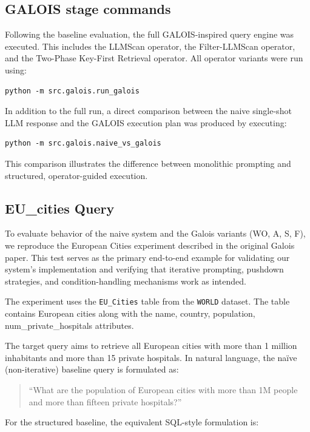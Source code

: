 \documentclass[12pt]{article}
\begin{document}
\subsection{GALOIS stage commands}
Following the baseline evaluation, the full GALOIS-inspired query engine was executed. This includes the LLMScan operator, the Filter-LLMScan operator, and the Two-Phase Key-First Retrieval operator. All operator variants were run using:

\begin{verbatim}
python -m src.galois.run_galois
\end{verbatim}

In addition to the full run, a direct comparison between the naive single-shot LLM response and the GALOIS execution plan was produced by executing:

\begin{verbatim}
python -m src.galois.naive_vs_galois
\end{verbatim}

This comparison illustrates the difference between monolithic prompting and structured, operator-guided execution.

\subsection{EU\_cities Query}

To evaluate behavior of the naive system and the Galois variants (WO, A, S, F), we reproduce the European Cities experiment described in the original Galois paper. This test serves as the primary end-to-end example for validating our system’s implementation and verifying that iterative prompting, pushdown strategies, and condition-handling mechanisms work as intended.

The experiment uses the \texttt{EU\_Cities} table from the \texttt{WORLD} dataset. The table contains European cities along with the name, country, population, num\_private\_hospitals attributes.

The target query aims to retrieve all European cities with more than 1 million inhabitants and more than 15 private hospitals. In natural language, the naïve (non-iterative) baseline query is formulated as:

\begin{quote}
``What are the population of European cities with more than 1M people and more than fifteen private hospitals?''
\end{quote}

For the structured baseline, the equivalent SQL-style formulation is:
\end{document}
